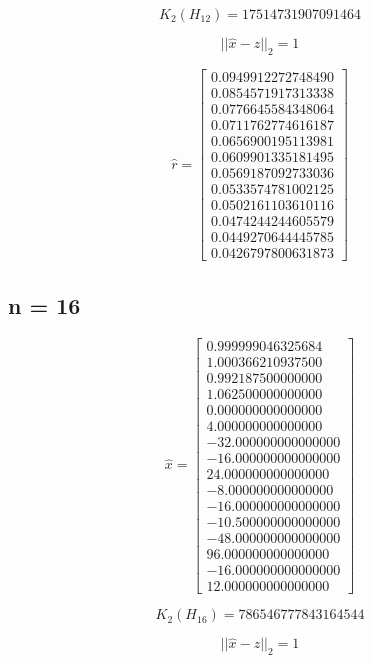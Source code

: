 \documentclass[a4paper,12pt]{article}
\begin{document}
$$ K_{2}(H_{12}) = 17514731907091464$$ 

$$ || \hat{x}-z ||_{2} = 1 $$

$$ \hat{r} = \left[ \begin{array}{c}
   0.0949912272748490 \\
   0.0854571917313338 \\
   0.0776645584348064 \\
   0.0711762774616187 \\
   0.0656900195113981 \\
   0.0609901335181495 \\
   0.0569187092733036 \\
   0.0533574781002125 \\
   0.0502161103610116 \\
   0.0474244244605579 \\
   0.0449270644445785 \\
   0.0426797800631873 
              \end{array}
       \right]
$$

\subsection{n = 16}

$$ \hat{x} = \left[ \begin{array}{c}
    0.999999046325684 \\
    1.000366210937500 \\
    0.992187500000000 \\
    1.062500000000000 \\
    0.000000000000000 \\
    4.000000000000000 \\
  -32.000000000000000 \\
  -16.000000000000000 \\
   24.000000000000000 \\
   -8.000000000000000 \\
  -16.000000000000000 \\
  -10.500000000000000 \\
  -48.000000000000000 \\
   96.000000000000000 \\
  -16.000000000000000 \\
   12.000000000000000
              \end{array}
       \right]
$$

$$ K_{2}(H_{16}) = 786546777843164544$$

$$ || \hat{x}-z ||_{2} = 1 $$
\end{document}

